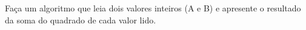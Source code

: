 
Faça um algoritmo que leia dois valores inteiros (A e B) e apresente o resultado da soma do quadrado de cada valor lido.

